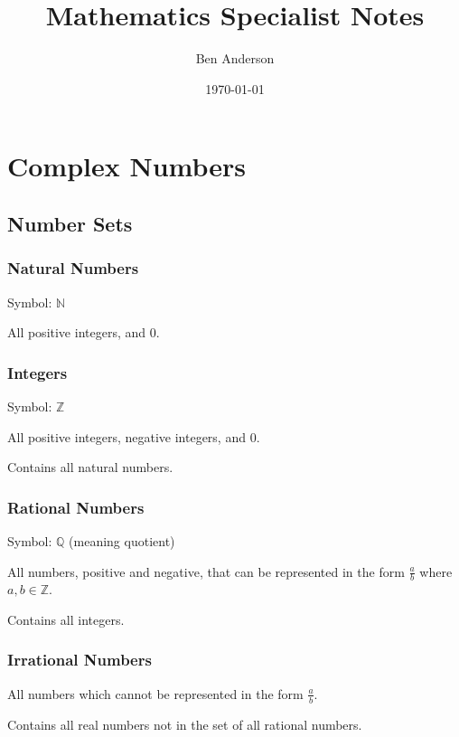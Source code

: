 \documentclass[a4paper,11pt]{report}
\begin{document}
\title{Mathematics Specialist Notes}
\author{Ben Anderson}
\date{\today}
\maketitle
\pagebreak

\tableofcontents
\pagebreak




\chapter{Complex Numbers}

\section{Number Sets}

\subsection{Natural Numbers}

Symbol: $\mathbb{N}$

All positive integers, and 0.

\subsection{Integers}

Symbol: $\mathbb{Z}$

All positive integers, negative integers, and 0.

Contains all natural numbers.

\subsection{Rational Numbers}

Symbol: $\mathbb{Q}$ (meaning quotient)

All numbers, positive and negative, that can be represented in the form
$\frac{a}{b}$ where $a, b \in \mathbb{Z}$.

Contains all integers.

\subsection{Irrational Numbers}

All numbers which cannot be represented in the form $\frac{a}{b}$.

Contains all real numbers not in the set of all rational numbers.
\end{document}
